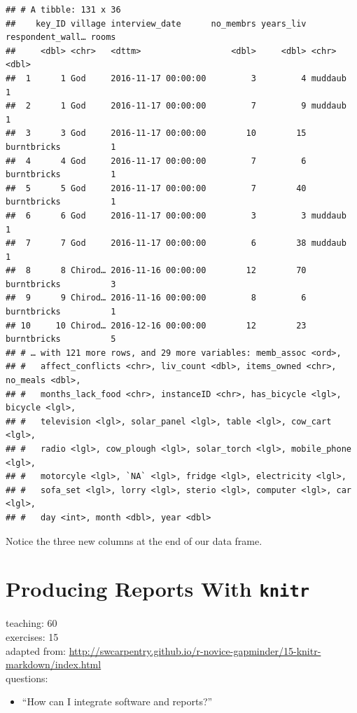 \documentclass[]{book}
\providecommand{\tightlist}{%
  \setlength{\itemsep}{0pt}\setlength{\parskip}{0pt}}
\begin{document}
\begin{verbatim}
## # A tibble: 131 x 36
##    key_ID village interview_date      no_membrs years_liv respondent_wall… rooms
##     <dbl> <chr>   <dttm>                  <dbl>     <dbl> <chr>            <dbl>
##  1      1 God     2016-11-17 00:00:00         3         4 muddaub              1
##  2      1 God     2016-11-17 00:00:00         7         9 muddaub              1
##  3      3 God     2016-11-17 00:00:00        10        15 burntbricks          1
##  4      4 God     2016-11-17 00:00:00         7         6 burntbricks          1
##  5      5 God     2016-11-17 00:00:00         7        40 burntbricks          1
##  6      6 God     2016-11-17 00:00:00         3         3 muddaub              1
##  7      7 God     2016-11-17 00:00:00         6        38 muddaub              1
##  8      8 Chirod… 2016-11-16 00:00:00        12        70 burntbricks          3
##  9      9 Chirod… 2016-11-16 00:00:00         8         6 burntbricks          1
## 10     10 Chirod… 2016-12-16 00:00:00        12        23 burntbricks          5
## # … with 121 more rows, and 29 more variables: memb_assoc <ord>,
## #   affect_conflicts <chr>, liv_count <dbl>, items_owned <chr>, no_meals <dbl>,
## #   months_lack_food <chr>, instanceID <chr>, has_bicycle <lgl>, bicycle <lgl>,
## #   television <lgl>, solar_panel <lgl>, table <lgl>, cow_cart <lgl>,
## #   radio <lgl>, cow_plough <lgl>, solar_torch <lgl>, mobile_phone <lgl>,
## #   motorcyle <lgl>, `NA` <lgl>, fridge <lgl>, electricity <lgl>,
## #   sofa_set <lgl>, lorry <lgl>, sterio <lgl>, computer <lgl>, car <lgl>,
## #   day <int>, month <dbl>, year <dbl>
\end{verbatim}

Notice the three new columns at the end of our data frame.

\chapter{\texorpdfstring{Producing Reports With
\texttt{knitr}}{Producing Reports With knitr}}\label{knitr}

teaching: 60\\
exercises: 15\\
adapted from:
\url{http://swcarpentry.github.io/r-novice-gapminder/15-knitr-markdown/index.html}\\
questions:

\begin{itemize}
\tightlist
\item
  ``How can I integrate software and reports?''
\end{itemize}
\end{document}
